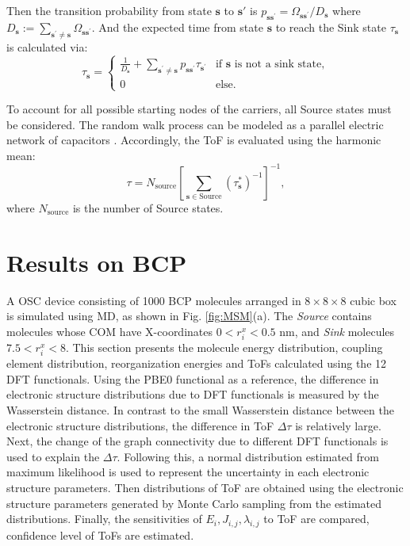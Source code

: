 \documentclass[letterpaper,12pt]{article}
\begin{document}
Then the transition probability from state $\mathbf{s}$ to $\mathbf{s}'$ is $p_{\mathbf{s} \mathbf{s}^\prime} = \Omega_{\mathbf{s} \mathbf{s}^\prime}/D_\mathbf{s}$ where $D_\mathbf{s} := \sum_{\mathbf{s}^\prime \ne \mathbf{s}} \Omega_{\mathbf{s} \mathbf{s}^\prime}$.
And the expected time from state $\mathbf{s}$ to reach the Sink state $\tau_\mathbf{s}$ is calculated via: 
\begin{equation}\label{eq:hitting_time}
	\tau_\mathbf{s} = \begin{cases}
		\frac{1}{D_\mathbf{s}} + \sum_{\mathbf{s}^\prime \ne \mathbf{s}} p_{\mathbf{s} \mathbf{s}^\prime} \tau_{\mathbf{s}^\prime} &\text{if $\mathbf{s}$ is not a sink state},\\
		0 &\text{else.} 
	\end{cases}
\end{equation} 

To account for all possible starting nodes of the carriers, all Source states must be considered. The random walk process can be modeled as a parallel electric network of capacitors \cite{doyle_random_2000}. Accordingly, the ToF is evaluated using the harmonic mean:
\begin{equation} 
\tau = N_\text{source} \left[\sum_{\mathbf{s} \in \text{Source}} (\tau_\mathbf{s}^\ast)^{-1}\right]^{-1},
\label{eq:ToF}
\end{equation}
where $N_\text{source}$ is the number of Source states.

\section{Results on BCP}
\label{sec:result}

A OSC device consisting of 1000 BCP molecules arranged in $8 \times 8 \times 8$ cubic box is simulated using MD, as shown in Fig. \ref{fig:MSM}(a).
The \textit{Source} contains molecules whose COM have X-coordinates $0 < r^x_i < 0.5$ nm, and \textit{Sink} molecules $7.5 < r^x_i < 8$. 
This section presents the molecule energy distribution, coupling element distribution, reorganization energies and ToFs calculated using the 12 DFT functionals. 
Using the PBE0 functional as a reference, the difference in electronic structure distributions due to DFT functionals is measured by the Wasserstein distance. In contrast to the small Wasserstein distance between the electronic structure distributions, the difference in ToF $\Delta \tau$ is relatively large. 
Next, the change of the graph connectivity due to different DFT functionals is used to explain the $\Delta \tau$.
Following this, a normal distribution estimated from maximum likelihood is used to represent the uncertainty in each electronic structure parameters. Then distributions of ToF are obtained using the electronic structure parameters generated by Monte Carlo sampling from the estimated distributions. Finally, the sensitivities of $E_i,J_{i,j},\lambda_{i,j}$ to ToF are compared, confidence level of ToFs are estimated. 
\end{document}
